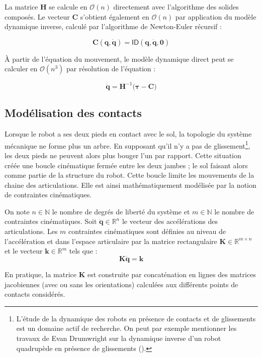 La matrice $\bm{H}$ se calcule en $\mathcal{O}(n)$ directement avec 
l'algorithme des solides composés. 
Le vecteur $\bm{C}$ s'obtient également en $\mathcal{O}(n)$ par application
du modèle dynamique inverse, calculé par l'algorithme de Newton-Euler récursif :

$$
\bm{C}(\bm{q}, \bm{\dot{q}}) = 
\mathsf{ID}(\bm{q}, \bm{\dot{q}}, \bm{0})
$$

À partir de l'équation du mouvement, le modèle dynamique direct
peut se calculer en $\mathcal{O}(n^3)$ par résolution de l'équation : 

$$
\bm{\ddot{q}} = \bm{H}^{-1}\big(\bm{\tau} - \bm{C}\big)
$$

\subsection{Modélisation des contacts}

Lorsque le robot a ses deux pieds en contact avec le sol,
la topologie du système mécanique ne forme plus un arbre.
En supposant qu'il n'y a pas de glissement\footnote{L'étude de la
dynamique des robots en présence de contacts et de glissements est
un domaine actif de recherche. On peut par exemple mentionner les travaux de
Evan Drumwright sur la dynamique inverse d'un robot quadrupède 
en présence de glissements (\cite{zapolsky_inverse_2017}).},
les deux pieds ne peuvent alors plus bouger l'un par rapport.
Cette situation créée une boucle cinématique fermée entre les deux jambes ; 
le sol faisant alors comme partie de la structure du robot.
Cette boucle limite les mouvements de la chaine des articulations.
Elle est ainsi mathématiquement modélisée par la notion 
de contraintes cinématiques.\\

\begin{definition}
    On note $n \in \mathbb{N}$ le nombre de degrés de liberté du système 
    et $m \in \mathbb{N}$ le nombre de contraintes cinématiques.
    Soit $\bm{\ddot{q}} \in \mathbb{R}^{n}$ le vecteur des accélérations
    des articulations.
    Les $m$ contraintes cinématiques sont définies au niveau de l'accélération
    et dans l'espace articulaire par la matrice rectangulaire 
    $\bm{K} \in \mathbb{R}^{m \times n}$ et le vecteur $\bm{k} \in \mathbb{R}^{m}$ 
    tels que :
    $$
    \bm{K}\bm{\ddot{q}} = \bm{k}
    $$
\end{definition}

En pratique, la matrice $\bm{K}$ est construite par
concaténation en lignes des matrices jacobiennes (avec ou sans les orientations)
calculées aux différents points de contacts considérés.

